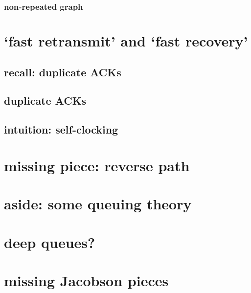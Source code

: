 \subsubsection{non-repeated graph}



\section{`fast retransmit' and `fast recovery'}

\subsection{recall: duplicate ACKs}


\subsection{duplicate ACKs}

\subsection{intuition: self-clocking}


\section{missing piece: reverse path}


\section{aside: some queuing theory}


\section{deep queues?}


\section{missing Jacobson pieces}
